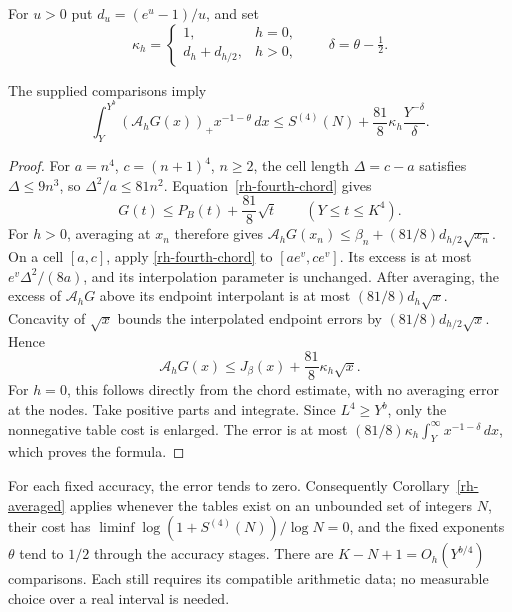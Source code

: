 For $u>0$ put $d_u=(e^u-1)/u$, and set
\[
 \kappa_h=\begin{cases}1,&h=0,\\d_h+d_{h/2},&h>0,\end{cases}
 \qquad\delta=\theta-\tfrac12.
\]
\begin{theorem}\label{rh-fourth-theorem}
The supplied comparisons imply
\begin{equation}\label{rh-fourth-estimate}
 \int_Y^{Y^b}(\mathcal A_hG(x))_+x^{-1-\theta}\,dx
 \le S^{(4)}(N)+\frac{81}{8}\kappa_h\frac{Y^{-\delta}}\delta.
\end{equation}
\end{theorem}
\begin{proof}
For $a=n^4$, $c=(n+1)^4$, $n\ge2$, the cell length
$\Delta=c-a$ satisfies $\Delta\le9n^3$, so
$\Delta^2/a\le81n^2$. Equation~\eqref{rh-fourth-chord} gives
\[
 G(t)\le P_B(t)+\frac{81}{8}\sqrt t
                         \qquad(Y\le t\le K^4).
\]
For $h>0$, averaging at $x_n$ therefore gives
$\mathcal A_hG(x_n)\le\beta_n+(81/8)d_{h/2}\sqrt{x_n}$.
On a cell $[a,c]$, apply \eqref{rh-fourth-chord} to
$[ae^v,ce^v]$. Its excess is at most $e^v\Delta^2/(8a)$,
and its interpolation parameter is unchanged. After averaging,
the excess of $\mathcal A_hG$ above its endpoint interpolant
is at most $(81/8)d_h\sqrt x$.
Concavity of $\sqrt x$ bounds the interpolated endpoint errors
by $(81/8)d_{h/2}\sqrt x$. Hence
\[
 \mathcal A_hG(x)\le J_\beta(x)+\frac{81}{8}\kappa_h\sqrt x.
\]
For $h=0$, this follows directly from the chord estimate, with no
averaging error at the nodes. Take positive parts and integrate.
Since $L^4\ge Y^b$, only the nonnegative table cost is enlarged.
The error is at most $(81/8)\kappa_h\int_Y^\infty x^{-1-\delta}\,dx$,
which proves the formula.
\end{proof}

For each fixed accuracy, the error tends to zero. Consequently
Corollary~\ref{rh-averaged} applies whenever the tables exist on an
unbounded set of integers $N$, their cost has
$\liminf\log(1+S^{(4)}(N))/\log N=0$, and the fixed exponents
$\theta$ tend to $1/2$ through the accuracy stages. There are
$K-N+1=O_h(Y^{b/4})$ comparisons. Each still requires its compatible
arithmetic data; no measurable choice over a real interval is needed.
